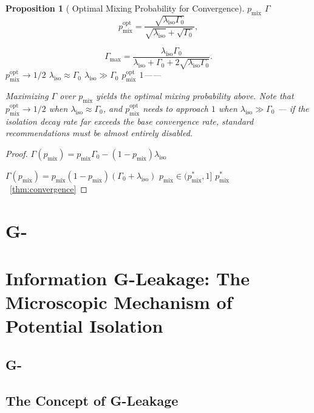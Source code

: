\documentclass[11pt,a4paper]{article}
\newtheorem{proposition}[theorem]{Proposition}
\theoremstyle{remark}
\newcommand{\ISOLambda}{\lambda_{\text{iso}}}
\begin{document}
\begin{proposition}[ Optimal Mixing Probability for Convergence]
\label{prop:optimalmix}
 $p_{\text{mix}}$  $\Gamma$ 
\[
p_{\text{mix}}^{\text{opt}} = \frac{\sqrt{\ISOLambda \Gamma_0}}{\sqrt{\ISOLambda} + \sqrt{\Gamma_0}},
\]

\[
\Gamma_{\max} = \frac{\ISOLambda \Gamma_0}{\ISOLambda + \Gamma_0 + 2\sqrt{\ISOLambda \Gamma_0}}.
\]
 $p_{\text{mix}}^{\text{opt}} \to 1/2$  $\ISOLambda \approx \Gamma_0$
 $\ISOLambda \gg \Gamma_0$  $p_{\text{mix}}^{\text{opt}}$  $1$——


Maximizing $\Gamma$ over $p_{\text{mix}}$ yields the optimal mixing probability above.
Note that $p_{\text{mix}}^{\text{opt}} \to 1/2$ when $\ISOLambda \approx \Gamma_0$,
and $p_{\text{mix}}^{\text{opt}}$ needs to approach $1$ when $\ISOLambda \gg \Gamma_0$
--- if the isolation decay rate far exceeds the base convergence rate, standard
recommendations must be almost entirely disabled.
\end{proposition}

\begin{proof}
$\Gamma(p_{\text{mix}}) = p_{\text{mix}}\Gamma_0 - (1-p_{\text{mix}})\ISOLambda$

$\Gamma(p_{\text{mix}}) = p_{\text{mix}}(1-p_{\text{mix}})(\Gamma_0 + \ISOLambda)$
 $p_{\text{mix}} \in (p_{\text{mix}}^*, 1]$ 
 $p_{\text{mix}}^*$ ~\ref{thm:convergence}
\end{proof}

\section{G-}
\section{Information G-Leakage: The Microscopic Mechanism of Potential Isolation}

\subsection{G-}

\subsection{The Concept of G-Leakage}
\end{document}
